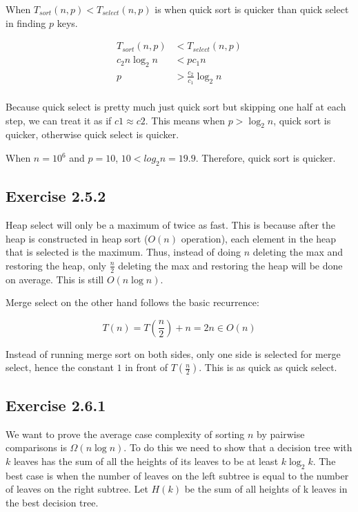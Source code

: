 \documentclass{article}
\begin{document}
When \(T_{sort}(n,p) < T_{select}(n,p)\) is when quick sort is quicker than quick select in finding \(p\) keys.

\begin{align*}
T_{sort}(n,p) &< T_{select}(n,p) \\
c_2n \log_2{n} &< pc_1n \\
p &> \frac{c_2}{c_1} \log_2{n} \\
\end{align*}

Because quick select is pretty much just quick sort but skipping one half at each step, we can treat it as if \(c1 \approx c2 \). This means when \(p > \log_2{n}\), quick sort is quicker, otherwise quick select is quicker.

When \(n=10^6\) and \(p=10\), \(10 < log_2{n}= 19.9\). Therefore, quick sort is quicker.


\subsection*{Exercise 2.5.2}

Heap select will only be a maximum of twice as fast. This is because after the heap is constructed in heap sort (\(O(n)\) operation), each element in the heap that is selected is the maximum. Thus, instead of doing \(n\) deleting the max and restoring the heap, only \(\frac{n}{2}\) deleting the max and restoring the heap will be done on average. This is still \(O(n\log{n})\).

Merge select on the other hand follows the basic recurrence:

\[T(n)=T\left(\frac{n}{2}\right)+n=2n \in O(n)\]

Instead of running merge sort on both sides, only one side is selected for merge select, hence the constant \(1\) in front of \(T(\frac{n}{2})\). This is as quick as quick select.


\subsection*{Exercise 2.6.1}

We want to prove the average case complexity of sorting \(n\) by pairwise comparisons is \(\Omega(n\log{n})\). To do this we need to show that a decision tree with \(k\) leaves has the sum of all the heights of its leaves to be at least \(k\log_2{k}\). The best case is when the number of leaves on the left subtree is equal to the number of leaves on the right subtree. Let \(H(k)\) be the sum of all heights of k leaves in the best decision tree. 
\end{document}
